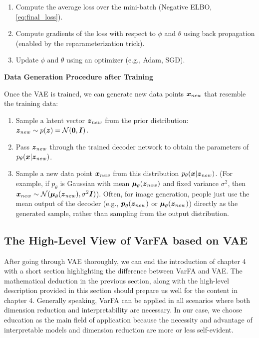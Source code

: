 \begin{enumerate}
\begin{enumerate}
\begin{enumerate}
                              the analytical formula (\ref{eq:kl_gaussian}) with $\vmu_{\phi}(\vx^{(i)})$ and
                              $\vsigma^2_{\phi}(\vx^{(i)})$.
                    \end{enumerate}
              \item Compute the average loss over the mini-batch (Negative ELBO,
                    \eqref{eq:final_loss}).
              \item Compute gradients of the loss with respect to $\phi$ and $\theta$ using back
                    propagation (enabled by the reparameterization trick).
              \item Update $\phi$ and $\theta$ using an optimizer (e.g., Adam, SGD).
          \end{enumerate}
\end{enumerate}

\textbf{Data Generation Procedure after Training}

Once the VAE is trained, we can generate new data points $\boldsymbol{x}_{new}$ that
resemble the training data:
\begin{enumerate}
    \item Sample a latent vector $\boldsymbol{z}_{new}$ from the prior distribution: $\boldsymbol{z}_{new} \sim
              p(\boldsymbol{z}) = \mathcal{N}(\mathbf{0}, \boldsymbol{I})$.
    \item Pass $\boldsymbol{z}_{new}$ through the trained decoder network to obtain the parameters
          of $p_{\theta}(\boldsymbol{x}|\boldsymbol{z}_{new})$.
    \item Sample a new data point $\boldsymbol{x}_{new}$ from this distribution
          $p_{\theta}(\boldsymbol{x}|\boldsymbol{z}_{new})$. (For example, if $p_{\theta}$ is Gaussian with
          mean $\boldsymbol{\mu}_{\theta}(\boldsymbol{z}_{new})$ and fixed variance $\sigma^2$, then $\boldsymbol{x}_{new}
              \sim \mathcal{N}(\boldsymbol{\mu}_{\theta}(\boldsymbol{z}_{new}), \sigma^2\boldsymbol{I})$). Often, for image
          generation, people just use the mean output of the decoder (e.g.,
          $\boldsymbol{p}_{\theta}(\boldsymbol{z}_{new})$ or $\boldsymbol{\mu}_{\theta}(\boldsymbol{z}_{new})$) directly as
          the generated sample, rather than sampling from the output distribution.
\end{enumerate}
\subsection{The High-Level View of VarFA based on VAE}
After going through VAE thoroughly, we can end the introduction of chapter 4
with a short section highlighting the difference between VarFA and VAE. The
mathematical deduction in the previous section, along with the high-level
description provided in this section should prepare us well for the content in
chapter 4. Generally speaking, VarFA can be applied in all scenarios where both
dimension reduction and interpretability are necessary. In our case, we choose
education as the main field of application because the necessity and advantage
of interpretable models and dimension reduction are more or less self-evident.

